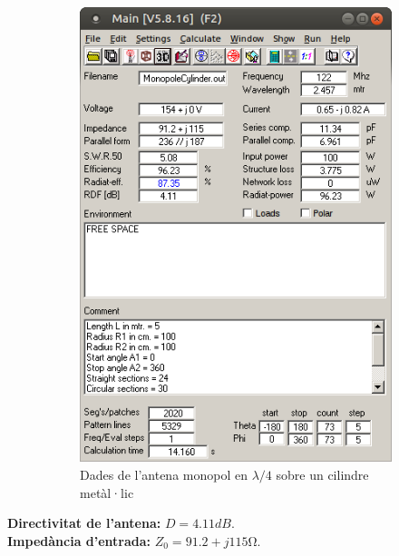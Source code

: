 \begin{figure}[H]
\begin{subfigure}[b]{0.32\textwidth}
	  \includegraphics[width=\textwidth]{./images/5.Monopole_cylinder/menu.png}
	  \caption{Dades de l'antena monopol en $\lambda/4$ sobre un cilindre metàl·lic}
	  \label{1menu}
	  \end{subfigure}
	  \vspace{10pt}
	\caption{}
	\label{diag2}
	\end{figure}

	\textbf{Directivitat de l'antena:} $ D=4.11 dB$. \\
	\textbf{Impedància d'entrada:} $ Z_0=91.2+j115 \si{\ohm}$.
